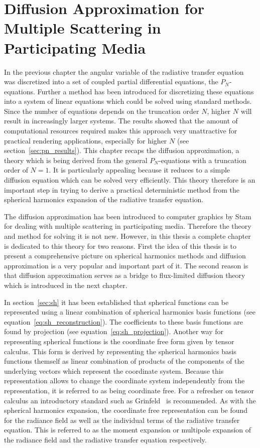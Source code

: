 \chapter{Diffusion Approximation for Multiple Scattering in Participating Media}
%
\label{sec:diffusion_approximation}

In the previous chapter the angular variable of the radiative transfer equation was discretized into a set of coupled partial differential equations, the $P_N$-equations. Further a method has been introduced for discretizing these equations into a system of linear equations which could be solved using standard methods. Since the number of equations depends on the truncation order $N$, higher $N$ will result in increasingly larger systems. The results showed that the amount of computational resources required makes this approach very unattractive for practical rendering applications, especially for higher $N$ (see section~\ref{sec:pn_results}). This chapter recaps the diffusion approximation, a theory which is being derived from the general $P_N$-equations with a truncation order of $N=1$. It is particularly appealing because it reduces to a simple diffusion equation which can be solved very efficiently. This theory therefore is an important step in trying to derive a practical deterministic method from the spherical harmonics expansion of the radiative transfer equation.

The diffusion approximation has been introduced to computer graphics by Stam~\cite{Stam95} for dealing with multiple scattering in participating media. Therefore the theory and method for solving it is not new. However, in this thesis a complete chapter is dedicated to this theory for two reasons. First the idea of this thesis is to present a comprehensive picture on spherical harmonics methods and diffusion approximation is a very popular and important part of it. The second reason is that diffusion approximation serves as a bridge to flux-limited diffusion theory which is introduced in the next chapter.

In section~\ref{sec:sh} it has been established that spherical functions can be represented using a linear combination of spherical harmonics basis functions (see equation~\ref{eq:sh_reconstruction}). The coefficients to these basis functions are found by projection (see equation~\ref{eq:sh_projection}). Another way for representing spherical functions is the coordinate free form given by tensor calculus. This form is derived by representing the spherical harmonics basis functions themself as linear combination of products of the components of the underlying vectors which represent the coordinate system. Because this representation allows to change the coordinate system independently from the representation, it is referred to as being coordinate free. For a refresher on tensor calculus an introductory standard such as Grinfeld~\cite{Grinfeld13} is recommended. As with the spherical harmonics expansion, the coordinate free representation can be found for the radiance field as well as the individual terms of the radiative transfer equation. This is referred to as the moment expansion or multipole expansion of the radiance field and the radiative transfer equation respectively.

